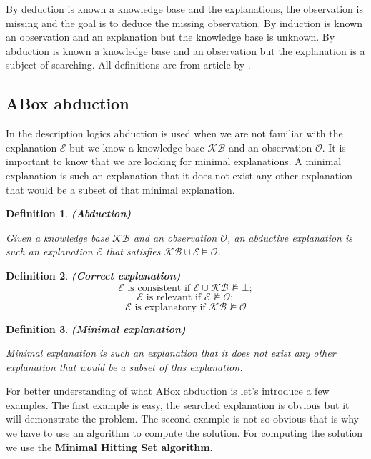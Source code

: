 \documentclass[12pt,a4paper]{article}
\newtheorem{definition}{Definition}[subsection]
\begin{document}
By deduction is known a knowledge base and the explanations, the observation is missing and the goal is to deduce the missing observation. By induction is known an observation and an explanation but the knowledge base is unknown. By abduction is known a knowledge base and an observation but the explanation is a subject of searching. All definitions are from article by \cite{pukancovaAboxAbduction}.

\subsection{ABox abduction}
In the description logics abduction is used when we are not familiar with the explanation $\mathcal{E}$ but we know a knowledge base $\mathcal{KB}$ and an observation $\mathcal{O}$. It is important to know that we are looking for minimal explanations. A minimal explanation is such an explanation that it does not exist any other explanation that would be a subset of that minimal explanation.

\begin{definition}{\textbf{(Abduction)}} 

	Given a knowledge base $\mathcal{KB}$ and an observation $\mathcal{O}$, an abductive explanation is such an explanation $\mathcal{E}$ that satisfies $\mathcal{KB} \cup \mathcal{E} \models \mathcal{O}$.
\end{definition}

\begin{definition}{\textbf{(Correct explanation)}}
	\[ \mathcal{E} \text{ is consistent if } \mathcal{E} \cup \mathcal{KB} \not \models \mathcal{\bot}; \] 
	\[ \mathcal{E} \text{ is relevant if } \mathcal{E} \not \models \mathcal{O}; \]
	\[ \mathcal{E} \text{ is explanatory if } \mathcal{KB} \not \models \mathcal{O} \]
\end{definition}

\begin{definition}{\textbf{(Minimal explanation)}}
	
	Minimal explanation is such an explanation that it does not exist any other explanation that would be a subset of this explanation.
\end{definition}

For better understanding of what ABox abduction is let's introduce a few examples. The first example is easy, the searched explanation is obvious but it will demonstrate the problem. The second example is not so obvious that is why we have to use an algorithm to compute the solution. For computing the solution we use the \textbf{Minimal Hitting Set algorithm}.
\end{document}

